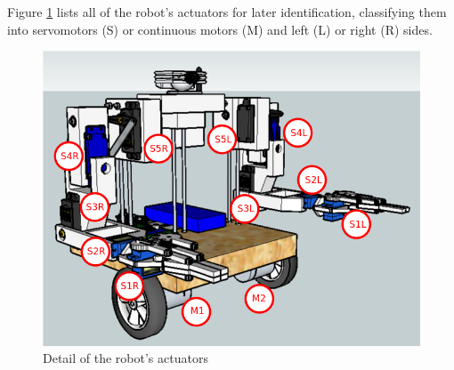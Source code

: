 Figure \ref{ass31} lists all of the robot's actuators for later identification, classifying them into servomotors (S) or continuous motors (M) and left (L) or right (R) sides.\\

\begin{figure}[H]
			\centering
			\includegraphics[scale=0.45]{images/Assembly/34-2.png}
			\caption{Detail of the robot's actuators }
			\label{ass31}
	\end{figure}
	\bigskip


















































































